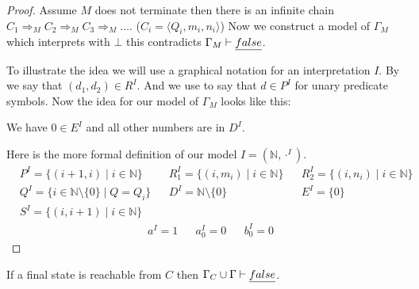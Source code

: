 \begin{proof}
Assume $M$ does not terminate then there is an infinite chain $C_1\Rightarrow_M C_2\Rightarrow_M C_3\Rightarrow_M\dots$. ($C_i=\langle Q_i,m_i,n_i\rangle$) Now we construct a model of $\Gamma_M$ which interprets \false{} with $\bot$ this contradicts $\Gamma_M\vdash\emph{false}$.

To illustrate the idea we will use a graphical notation for an interpretation $I$.
By
we say that $(d_1,d_2)\in R^I$. And we use
to say that $d\in P^I$ for unary predicate symbols. Now the idea for our model of $\Gamma_M$ looks like this:

\begin{figure}[H]

\end{figure}
We have $0\in E^I$ and all other numbers are in $D^I$.

Here is the more formal definition of our model $I=(\mathbb{N},\cdot^I)$.
\begin{align*}
& P^I=\{(i+1,i)\mid i\in\mathbb{N}\} && R_1^I=\{(i,m_i)\mid i\in\mathbb{N}\} && R_2^I=\{(i,n_i)\mid i\in\mathbb{N}\}\\
& Q^I=\{ i\in\mathbb{N}\setminus\{0\}\mid Q=Q_i\} && D^I=\mathbb{N}\setminus\{0\} && E^I=\{0\}\\
& S^I=\{(i,i+1)\mid i\in\mathbb{N}\}
\end{align*}
\begin{align*}
& a^I=1 && a_0^I=0 && b_0^I=0
\end{align*}
\end{proof}
\begin{claim}
If a final state is reachable from $C$ then $\Gamma_C\cup\Gamma\vdash\emph{false}$.
\end{claim}
